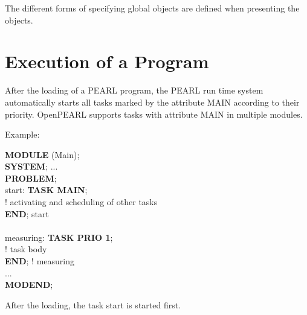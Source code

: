 The different forms of specifying global objects are defined when
presenting the objects.

\section{Execution of a Program}   %
\label{sec_program_execution}

After the loading of a PEARL program, the PEARL run time system
automatically starts all tasks marked by the attribute MAIN according
to their priority.  
OpenPEARL supports tasks with attribute MAIN in multiple modules.

Example:

\begin{tabbing}
{\bf MODULE} (Main); \= \\
{\bf SYSTEM}; ...    \> \\
{\bf PROBLEM};       \> \\
start:               \> {\bf TASK MAIN};\\
                     \> ! activating and scheduling of other tasks\\
                     \> {\bf END}; start\\
                     \> \\
measuring:           \> {\bf TASK PRIO 1};\\
                     \> ! task body \\
                     \> {\bf END}; ! measuring\\
...                  \> \\
{\bf MODEND};        \>
\end{tabbing}

After the loading, the task start is started first.

